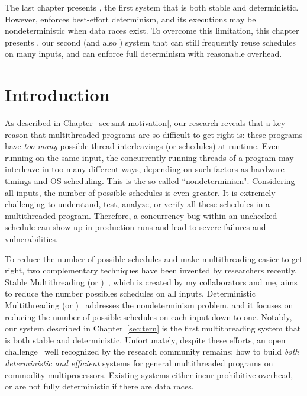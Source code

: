 The last chapter presents \tern, the first system that is both stable and 
deterministic. However, \tern enforces best-effort determinism, and its 
executions may be nondeterministic when data races exist. To overcome this 
limitation, this chapter presents \peregrine, our second \smt (and also \dmt) 
system that can still frequently reuse schedules on many inputs, and can 
enforce full determinism with reasonable overhead.

\section{Introduction} \label{sec:peregrine-intro}

As described in Chapter~\ref{sec:smt-motivation}, our research reveals that a
key reason that multithreaded programs are so difficult to get right is: these
programs have \emph{too many} possible thread interleavings (or schedules) at
runtime. Even running on the same input, the concurrently running threads of a
program may interleave in too many different ways, depending on such factors as
hardware timings and OS scheduling. This is the so called ``nondeterminism".
Considering all inputs, the number of possible schedules is even greater. It is
extremely challenging to understand, test, analyze, or verify all
these schedules in a multithreaded program. Therefore, a concurrency bug within
an unchecked schedule can show up in production runs and lead to severe
failures and vulnerabilities.

To reduce the number of possible schedules and make multithreading easier to get
right, two complementary techniques have been invented by researchers recently.
Stable Multithreading (or \smt)~\cite{determinator:osdi10, cui:tern:osdi10}, 
which
is created by my collaborators and me, aims to reduce the number possibles
schedules on all inputs. Deterministic Multithreading
(or \dmt)~\cite{dmp:asplos09,kendo:asplos09,coredet:asplos10,
dos:osdi10,grace:oopsla09} addresses the nondeterminism problem, and it focuses
on reducing the number of possible schedules on each input down to one. Notably,
our \tern system described in Chapter~\ref{sec:tern} is the first multithreading 
system that is both stable and deterministic. Unfortunately, despite these 
efforts, an open challenge~\cite{wodet11}
well recognized by the research community remains: how to build \emph{both
deterministic and efficient} \dmt systems for general multithreaded programs on
commodity multiprocessors.  Existing \dmt systems either incur prohibitive
overhead, or are not fully deterministic if there are data races.

